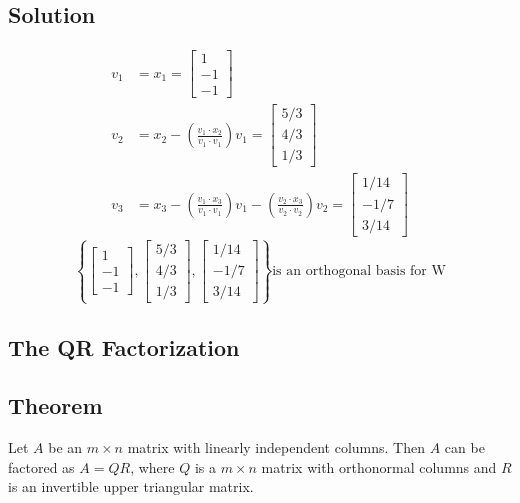 \subsection*{Solution}
\begin{align*}
    v_1 & =x_1=\begin{bmatrix}
        1 \\-1\\-1
    \end{bmatrix}                                                                                                     \\
    v_2 & =x_2-\left(\frac{v_1\cdot x_2}{v_1\cdot v_1}\right)v_1=\begin{bmatrix}
        5/3 \\4/3\\1/3
    \end{bmatrix}                                                   \\
    v_3 & =x_3-\left(\frac{v_1\cdot x_3}{v_1\cdot v_1}\right)v_1-\left(\frac{v_2\cdot x_3}{v_2\cdot v_2}\right)v_2=\begin{bmatrix}
        1/14 \\-1/7\\3/14
    \end{bmatrix}
\end{align*}
\[
    \left\{\begin{bmatrix}
        1 \\-1\\-1
    \end{bmatrix},\begin{bmatrix}
        5/3 \\4/3\\1/3
    \end{bmatrix},\begin{bmatrix}
        1/14 \\-1/7\\3/14
    \end{bmatrix}\right\} \text{is an orthogonal basis for W}
\]

\subsection*{The QR Factorization}

\subsection*{Theorem}
Let $A$ be an $m\times n$ matrix with linearly independent columns.
Then $A$ can be factored as $A = QR$, where $Q$ is a $m\times n$ matrix with
orthonormal columns and $R$ is an invertible upper triangular matrix.

